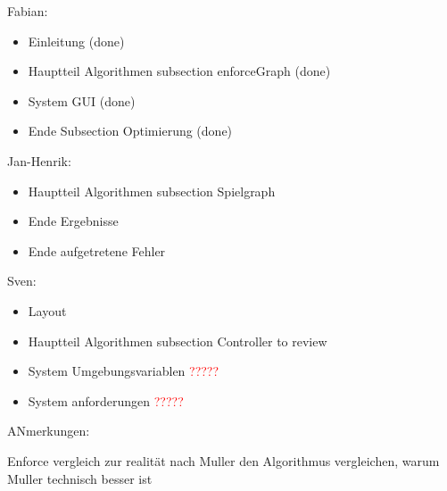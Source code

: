 Fabian:
\begin{itemize}
	\item Einleitung (done)
	\item Hauptteil Algorithmen subsection enforceGraph (done)
	\item System GUI (done)
	\item Ende Subsection Optimierung (done)
\end{itemize}
Jan-Henrik:
\begin{itemize}
	\item Hauptteil Algorithmen subsection Spielgraph
	\item Ende Ergebnisse
	\item Ende aufgetretene Fehler
\end{itemize}
Sven:
\begin{itemize}
	\item Layout
	\item Hauptteil Algorithmen subsection Controller to review
	\item System Umgebungsvariablen \textcolor{red}{?????}
	\item System anforderungen \textcolor{red}{?????}
\end{itemize}



ANmerkungen:

Enforce vergleich zur realität
nach Muller den Algorithmus vergleichen, warum Muller technisch besser ist

